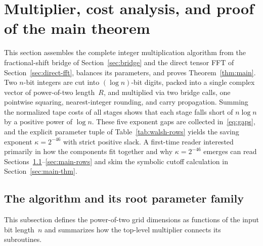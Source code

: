 \section{Multiplier, cost analysis, and proof of the main theorem}\label{sec:main}

This section assembles the complete integer multiplication algorithm from the fractional-shift bridge of
Section~\ref{sec:bridge} and the direct tensor FFT of Section~\ref{sec:direct-fft}, balances its parameters, and proves
Theorem~\ref{thm:main}. Two $n$-bit integers are cut into $(\log n)$-bit digits, packed into a single complex vector of
power-of-two length~$R$, and multiplied via two bridge calls, one pointwise squaring, nearest-integer rounding, and
carry propagation. Summing the normalized tape costs of all stages shows that each stage falls short of $n\log n$ by a positive power of
$\log n$. These five exponent gaps are collected in~\eqref{eq:gaps}, and the explicit parameter tuple of
Table~\ref{tab:walsh-rows} yields the saving exponent $\kappa=2^{-46}$ with strict positive slack. A first-time reader interested primarily in how the components fit together
and why $\kappa=2^{-46}$ emerges can read Sections~\ref{sec:main-alg}--\ref{sec:main-rows} and skim the symbolic cutoff
calculation in Section~\ref{sec:main-thm}.

\subsection{The algorithm and its root parameter family}\label{sec:main-alg}

This subsection defines the power-of-two grid dimensions as functions of the input bit length~$n$ and summarizes how the
top-level multiplier connects its subroutines.

